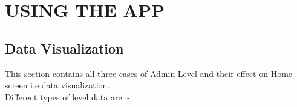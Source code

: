 \newpage

\section{USING THE APP}

\subsection{Data Visualization}



This section contains all three cases of Admin Level and their effect on Home screen i.e data visualization. \\

Different types of level data are :-


